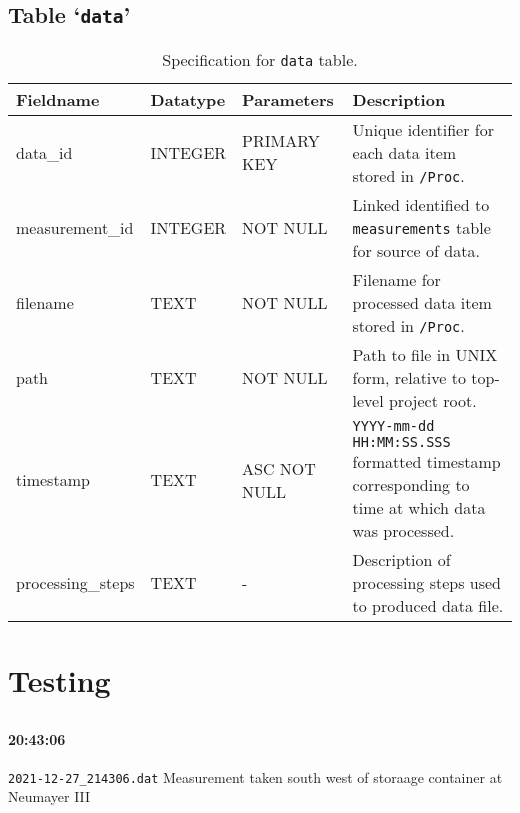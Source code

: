 \documentclass[a4paper]{article}
\newcommand{\sqlspectable}[2]{
    \renewcommand{\arraystretch}{1.5}
    \rowcolors{2}{gray!10}{white}
    \begin{longtable}{l l >{\raggedright}p{3cm} >{\raggedright\arraybackslash}p{4cm}}
        \caption{#2} \\
        \hline
        \textbf{Fieldname} & \textbf{Datatype} & \textbf{Parameters} & \textbf{Description}\\
        \hline
        \endhead
        \hline
        \endfoot
        #1
    \end{longtable}
}
\begin{document}
    \subsection{Table `\texttt{data}'}
    \sqlspectable{
        data\_id & INTEGER & PRIMARY KEY & 
        Unique identifier for each data item stored in \texttt{/Proc}. \\
        measurement\_id & INTEGER & NOT NULL &
        Linked identified to \texttt{measurements} table for source of
        data. \\
        filename & TEXT & NOT NULL &
        Filename for processed data item stored in \texttt{/Proc}. \\
        path & TEXT & NOT NULL & 
        Path to file in UNIX form, relative to top-level project root. \\
        timestamp&  TEXT & ASC NOT NULL &
        \texttt{YYYY-mm-dd HH:MM:SS.SSS} formatted timestamp corresponding
        to time at which data was processed. \\
        processing\_steps & TEXT & - & 
        Description of processing steps used to produced data file. \\
    }
    {Specification for \texttt{data} table.}
    

    \newpage

    \section{Testing}
    \subsection{}
    
    \paragraph{20:43:06} \texttt{2021-12-27\_214306.dat} Measurement taken south west of storaage container at Neumayer III
    
    \subsection{}
 
    \subsection{}

\end{document}
